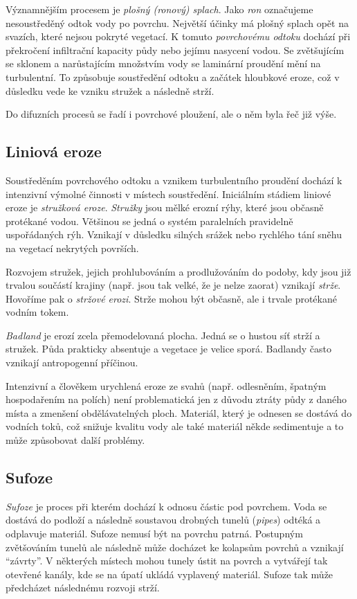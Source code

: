 Významnějším procesem je \emph{plošný (ronový) splach}. Jako \emph{ron} označujeme nesoustředěný odtok vody po povrchu. Největší účinky má plošný splach opět na svazích, které nejsou pokryté vegetací. K tomuto \emph{povrchovému odtoku} dochází při překročení infiltrační kapacity půdy nebo jejímu nasycení vodou. Se zvětšujícím se sklonem a narůstajícím množstvím vody se laminární proudění mění na turbulentní. To způsobuje soustředění odtoku a začátek hloubkové eroze, což v důsledku vede ke vzniku stružek a následně strží.

Do difuzních procesů se řadí i povrchové ploužení, ale o něm byla řeč již výše.

\subsection{Liniová eroze}
Soustředěním povrchového odtoku a vznikem turbulentního proudění dochází k intenzivní výmolné činnosti v místech soustředění. Iniciálním stádiem liniové eroze je \emph{stružková eroze}. \emph{Stružky} jsou mělké erozní rýhy, které jsou občasně protékané vodou. Většinou se jedná o systém paralelních pravidelně uspořádaných rýh. Vznikají v důsledku silných srážek nebo rychlého tání sněhu na vegetací nekrytých površích. 

Rozvojem stružek, jejich prohlubováním a prodlužováním do podoby, kdy jsou již trvalou součástí krajiny (např. jsou tak velké, že je nelze zaorat) vznikají \emph{strže}. Hovoříme pak o \emph{stržové erozi}. Strže mohou být občasně, ale i trvale protékané vodním tokem. 

\emph{Badland} je erozí zcela přemodelovaná plocha. Jedná se o hustou síť strží a stružek. Půda prakticky absentuje a vegetace je velice sporá. Badlandy často vznikají antropogenní příčinou. 

Intenzivní a člověkem urychlená eroze ze svahů (např. odlesněním, špatným hospodařením na polích) není problematická jen z důvodu ztráty půdy z daného místa a zmenšení obdělávatelných ploch. Materiál, který je odnesen se dostává do vodních toků, což snižuje kvalitu vody ale také materiál někde sedimentuje a to může způsobovat další problémy. 

\subsection{Sufoze}
\emph{Sufoze} je proces při kterém dochází k odnosu částic pod povrchem. Voda se dostává do podloží a následně soustavou drobných tunelů (\textit{pipes}) odtéká a odplavuje materiál. Sufoze nemusí být na povrchu patrná. Postupným zvětšováním tunelů ale následně může docházet ke kolapsům povrchů a vznikají \enquote{závrty}. V některých místech mohou tunely ústit na povrch a vytvářejí tak otevřené kanály, kde se na úpatí ukládá vyplavený materiál. Sufoze tak může předcházet následnému rozvoji strží. 

